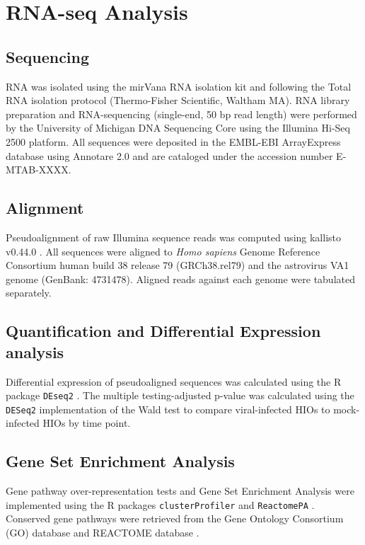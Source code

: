 \documentclass[11pt]{article}
\author{David R. Hill}
\date{\today}
\title{}
\begin{document}
\section*{{\bfseries\sffamily } RNA-seq Analysis}
\label{sec:org9b19f33}
\subsection*{{\bfseries\sffamily } Sequencing}
\label{sec:orga966f9f}
RNA was isolated using the mirVana RNA isolation kit and following the Total RNA isolation protocol (Thermo-Fisher Scientific, Waltham MA). RNA library preparation and RNA-sequencing (single-end, 50 bp read length) were performed by the University of Michigan DNA Sequencing Core using the Illumina Hi-Seq 2500 platform. All sequences were deposited in the EMBL-EBI ArrayExpress database using Annotare 2.0 and are cataloged under the accession number E-MTAB-XXXX. 
\subsection*{{\bfseries\sffamily } Alignment}
\label{sec:org95a9782}
Pseudoalignment of raw Illumina sequence reads was computed using kallisto v0.44.0 \cite{Bray:2016}. All sequences were aligned to \emph{Homo sapiens} Genome Reference Consortium human build 38 release 79 (GRCh38.rel79) and the astrovirus VA1 genome (GenBank: 4731478). Aligned reads against each genome were tabulated separately.
\subsection*{{\bfseries\sffamily } Quantification and Differential Expression analysis}
\label{sec:org5f77f08}
Differential expression of pseudoaligned sequences was calculated using the R package \texttt{DEseq2} \cite{Love:2014}. The multiple testing-adjusted p-value was calculated using the \texttt{DESeq2} implementation of the Wald test \cite{Love:2014} to compare viral-infected HIOs to mock-infected HIOs by time point. 
\subsection*{{\bfseries\sffamily } Gene Set Enrichment Analysis}
\label{sec:org72ed52d}
Gene pathway over-representation tests and Gene Set Enrichment Analysis \cite{Subramanian:2005} were implemented using the R packages \texttt{clusterProfiler} \cite{Yu:2012} and \texttt{ReactomePA} \cite{Yu:2016}. Conserved gene pathways were retrieved from the Gene Ontology Consortium (GO) database \cite{Gene_Ontology_Consortium:2015} and REACTOME database \cite{Fabregat:2018}.
\end{document}
